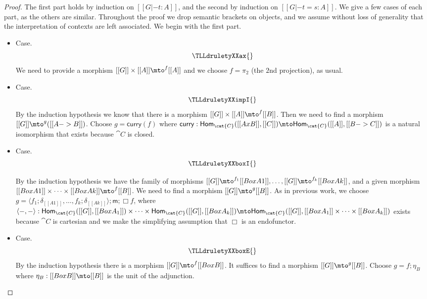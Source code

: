\begin{proof}
  The first part holds by induction on $[[G |- t : A]]$, and the
  second by induction on $[[G |- t = s : A]]$.  We give a few cases of
  each part, as the others are similar.  Throughout the proof we
  drop semantic brackets on objects, and we assume without loss of
  generality that the interpretation of contexts are left associated.
  We begin with the first part.

  \begin{itemize}
  \item[] Case.\\
    \[
    \TLLdruletyXXax{}
    \]
    We need to provide a morphism $[[G]] \times [[A]] \mto^{f}
    [[A]]$ and we choose $f = \pi_2$ (the $2$nd projection), as usual.

    \item[] Case.\\
    \[
    \TLLdruletyXXimpI{}
    \]
    By the induction hypothesis we know that there is a morphism
    $[[G]] \times [[A]] \mto^f [[B]]$.  Then we need  to find a
    morphism $[[G]] \mto^{g} ([[A -> B]])$.  Choose $g =
    \mathsf{curry}(f)$ where $\mathsf{curry} :
    \mathsf{Hom}_{\cat{C}}([[A x B]],[[C]]) \mto
    \mathsf{Hom}_{\cat{C}}([[A]],[[B -> C]])$ is a natural isomorphism
    that exists because $\cat{C}$ is closed.

  \item[] Case.\\
    \[
    \TLLdruletyXXboxI{}
    \]

    By the induction hypothesis we have the family of morphisms $[[G]]
    \mto^{f_1} [[Box A1]], \ldots, [[G]] \mto^{f_k} [[Box Ak]]$, and a given morphism
    $[[Box A1]] \times \cdots \times [[Box Ak]] \mto^f [[B]]$.  We need 
     to find a morphism $[[G]] \mto^{g} [[B]]$.  As in previous work, we choose $g =
    \langle f_1;\delta_{[[A1]]},\ldots,f_k;\delta_{[[Ak]]} \rangle;\mathsf{m};\Box f$, where $\langle -,-\rangle :
    \mathsf{Hom}_{\cat{C}}([[G]],[[Box A_1]]) \times \cdots \times
    \mathsf{Hom}_{\cat{C}}([[G]],[[Box A_k]]) \mto \mathsf{Hom}_{\cat{C}}([[G]],[[Box A_1]]
    \times \cdots \times [[Box A_k]])$ exists because $\cat{C}$ is cartesian and we make the simplifying assumption that $\Box$ is an endofunctor.

  \item[] Case.\\
    \[
    \TLLdruletyXXboxE{}
    \]
    By the induction hypothesis there is a morphism $[[G]] \mto^f
    [[Box B]]$.  It suffices to find a morphism $[[G]] \mto^{g}
    [[B]]$.  Choose $g = f;\eta_B$ where $\eta_B : [[Box B]] \mto [[B]]$
    is the unit of the adjunction.
  \end{itemize}


\end{proof}
